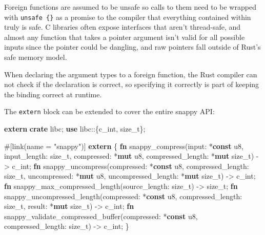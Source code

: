 \documentclass[a4paper,]{book}
\newenvironment{Shaded}{\begin{snugshade}}{\end{snugshade}}
\newcommand{\KeywordTok}[1]{\textcolor[rgb]{0.13,0.29,0.53}{\textbf{{#1}}}}
\newcommand{\DataTypeTok}[1]{\textcolor[rgb]{0.13,0.29,0.53}{{#1}}}
\newcommand{\StringTok}[1]{\textcolor[rgb]{0.31,0.60,0.02}{{#1}}}
\newcommand{\AttributeTok}[1]{\textcolor[rgb]{0.77,0.63,0.00}{{#1}}}
\newcommand{\NormalTok}[1]{{#1}}
\begin{document}
Foreign functions are assumed to be unsafe so calls to them need to be
wrapped with \texttt{unsafe\ \{\}} as a promise to the compiler that
everything contained within truly is safe. C libraries often expose
interfaces that aren't thread-safe, and almost any function that takes a
pointer argument isn't valid for all possible inputs since the pointer
could be dangling, and raw pointers fall outside of Rust's safe memory
model.

When declaring the argument types to a foreign function, the Rust
compiler can not check if the declaration is correct, so specifying it
correctly is part of keeping the binding correct at runtime.

The \texttt{extern} block can be extended to cover the entire snappy
API:

\begin{Shaded}
\begin{Highlighting}[]
\KeywordTok{extern} \KeywordTok{crate} \NormalTok{libc;}
\KeywordTok{use} \NormalTok{libc::\{}\DataTypeTok{c_int}\NormalTok{, }\DataTypeTok{size_t}\NormalTok{\};}

\AttributeTok{#[}\NormalTok{link}\AttributeTok{(}\NormalTok{name }\AttributeTok{=} \StringTok{"snappy"}\AttributeTok{)]}
\KeywordTok{extern} \NormalTok{\{}
    \KeywordTok{fn} \NormalTok{snappy_compress(input: *}\KeywordTok{const} \DataTypeTok{u8}\NormalTok{,}
                       \NormalTok{input_length: }\DataTypeTok{size_t}\NormalTok{,}
                       \NormalTok{compressed: *}\KeywordTok{mut} \DataTypeTok{u8}\NormalTok{,}
                       \NormalTok{compressed_length: *}\KeywordTok{mut} \DataTypeTok{size_t}\NormalTok{) -> }\DataTypeTok{c_int}\NormalTok{;}
    \KeywordTok{fn} \NormalTok{snappy_uncompress(compressed: *}\KeywordTok{const} \DataTypeTok{u8}\NormalTok{,}
                         \NormalTok{compressed_length: }\DataTypeTok{size_t}\NormalTok{,}
                         \NormalTok{uncompressed: *}\KeywordTok{mut} \DataTypeTok{u8}\NormalTok{,}
                         \NormalTok{uncompressed_length: *}\KeywordTok{mut} \DataTypeTok{size_t}\NormalTok{) -> }\DataTypeTok{c_int}\NormalTok{;}
    \KeywordTok{fn} \NormalTok{snappy_max_compressed_length(source_length: }\DataTypeTok{size_t}\NormalTok{) -> }\DataTypeTok{size_t}\NormalTok{;}
    \KeywordTok{fn} \NormalTok{snappy_uncompressed_length(compressed: *}\KeywordTok{const} \DataTypeTok{u8}\NormalTok{,}
                                  \NormalTok{compressed_length: }\DataTypeTok{size_t}\NormalTok{,}
                                  \NormalTok{result: *}\KeywordTok{mut} \DataTypeTok{size_t}\NormalTok{) -> }\DataTypeTok{c_int}\NormalTok{;}
    \KeywordTok{fn} \NormalTok{snappy_validate_compressed_buffer(compressed: *}\KeywordTok{const} \DataTypeTok{u8}\NormalTok{,}
                                         \NormalTok{compressed_length: }\DataTypeTok{size_t}\NormalTok{) -> }\DataTypeTok{c_int}\NormalTok{;}
\NormalTok{\}}
\end{Highlighting}
\end{Shaded}
\end{document}
